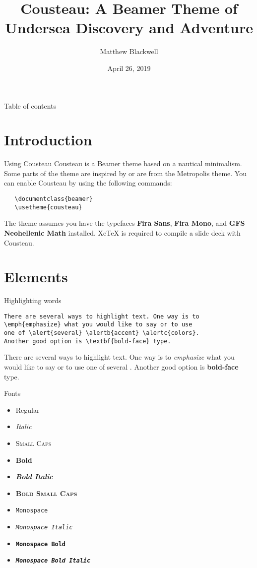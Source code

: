 \documentclass{beamer}
\title{Cousteau: A Beamer Theme of Undersea Discovery and Adventure}
\author{Matthew Blackwell}
\institute{Harvard University}
\date{April 26, 2019}
\begin{document}
\frame{\titlepage}


\begin{frame}{Table of contents}
  \tableofcontents
\end{frame}

\section{Introduction}

\begin{frame}[fragile]{Using Cousteau}
  Cousteau is a Beamer theme based on a nautical minimalism. Some parts of the theme are inspired by or are from the Metropolis theme. You can enable Cousteau by using the following commands:
\begin{verbatim}
   \documentclass{beamer}
   \usetheme{cousteau}
\end{verbatim}
  The theme assumes you have the typefaces \textbf{Fira Sans}, \textbf{Fira Mono}, and \textbf{GFS Neohellenic Math} installed. XeTeX is required to compile a slide deck with Cousteau.
\end{frame}


\section{Elements}

\begin{frame}[fragile]{Highlighting words}

\begin{verbatim}
There are several ways to highlight text. One way is to 
\emph{emphasize} what you would like to say or to use 
one of \alert{several} \alertb{accent} \alertc{colors}. 
Another good option is \textbf{bold-face} type. 
\end{verbatim}

  \bigskip
  
  There are several ways to highlight text. One way is to \emph{emphasize} what you would like to say or to use one of \alert{several}  . Another good option is \textbf{bold-face} type. 
  
\end{frame}

\begin{frame}{Fonts}
  \begin{itemize}
    \item Regular
    \item \textit{Italic}
    \item \textsc{Small Caps}
    \item \textbf{Bold}
    \item \textbf{\textit{Bold Italic}}
    \item \textbf{\textsc{Bold Small Caps}}
    \item \texttt{Monospace}
    \item \texttt{\textit{Monospace Italic}}
    \item \texttt{\textbf{Monospace Bold}}
    \item \texttt{\textbf{\textit{Monospace Bold Italic}}}
  \end{itemize}

  
\end{frame}
\end{document}

